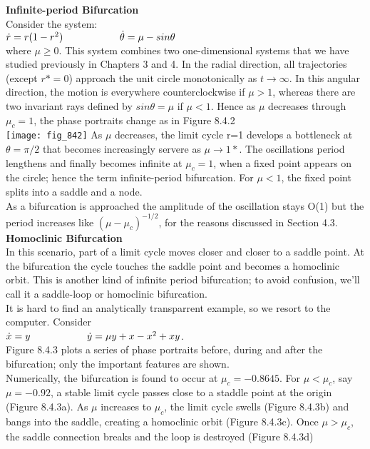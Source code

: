 \documentclass{article}
\newcommand\tab[1][1cm]{\hspace*{#1}}
\begin{document}
\textbf {Infinite-period Bifurcation} \\
Consider the system: \\ \tab \tab
$\dot{r}=r(1-r^{2}) \\
\tab \tab \dot{\theta}=\mu - sin\theta$ \\ 
where $\mu \geq 0$. This system combines two one-dimensional systems that we have studied previously in Chapters 3 and 4. In the radial direction, all trajectories (except $r*=0$) approach the unit circle monotonically as $t \to \infty$. In this angular direction, the motion is everywhere counterclockwise if $\mu > 1$, whereas there are two invariant rays defined by $sin \theta = \mu$ if $\mu < 1$. Hence as $\mu$ decreases through $\mu_{c}=1$, the phase portraits change as in Figure 8.4.2 \\
\texttt{[image: fig\_842]} 
As $\mu$ decreases, the limit cycle r=1 develops a bottleneck at $\theta = \pi / 2$ that becomes increasingly servere as $\mu \to 1*$. The oscillations period lengthens and finally becomes infinite at $\mu_{c}=1$, when a fixed point appears on the circle; hence the term infinite-period bifurcation. For $\mu < 1$, the fixed point splits into a saddle and a node. \\ \tab
As a bifurcation is approached the amplitude of the oscillation stays O(1) but the period increases like $(\mu -\mu_{c})^{-1/2}$, for the reasons discussed in Section 4.3. 
\textbf {Homoclinic Bifurcation} \\
\tab In this scenario, part of a limit cycle moves closer and closer to a saddle point. At the bifurcation the cycle touches the saddle point and becomes a homoclinic orbit. This is another kind of infinite period bifurcation; to avoid confusion, we'll call it a saddle-loop or homoclinic bifurcation. \\ \tab
It is hard to find an analytically transparrent example, so we resort to the computer. Consider \\ \tab \tab
$\dot{x}=y \\ \tab \tab
\dot{y}=\mu y + x-x^{2}+xy$. \\
Figure 8.4.3 plots a series of phase portraits before, during and after the bifurcation; only the important features are shown. \\ \tab
Numerically, the bifurcation is found to occur at $\mu_{c}=-0.8645$. For $\mu < \mu_{c}$, say $\mu = -0.92$, a stable limit cycle passes close to a staddle point at the origin (Figure 8.4.3a). As $\mu$ increases to $\mu_{c}$, the limit cycle swells (Figure 8.4.3b) and bangs into the saddle, creating a homoclinic orbit (Figure 8.4.3c). Once $\mu > \mu_{c}$, the saddle connection breaks and the loop is destroyed (Figure 8.4.3d) \\
\end{document}
